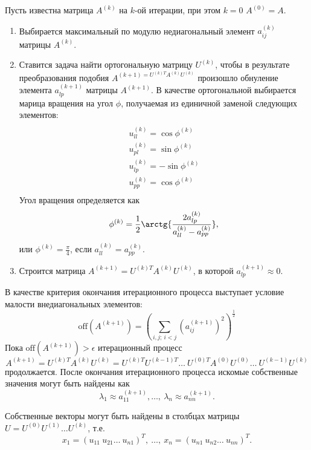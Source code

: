 \documentclass[a4paper,12pt]{article}
\begin{document}
Пусть известна матрица $A^{(k)}$ на $k$-ой итерации, при этом
$k = 0$ $A^{(0)} = A$.
\begin{enumerate}
    \item Выбирается максимальный по модулю недиагональный
    элемент $a_{ij}^{(k)}$ матрицы $A^{(k)}$.
    \item Ставится задача найти ортогональную матрицу $U^{(k)}$,
    чтобы в результате преобразования подобия
    $A^{(k + 1) = U^{(k) T} A^{(k)} U^{(k)}}$
    произошло обнуление элемента $a_{lp}^{(k + 1)}$
    матрицы $A^{(k + 1)}$. В качестве ортогональной выбирается
    марица вращения на угол $\phi$, получаемая из единичной
    заменой следующих элементов:
    \begin{multline}
    \\
    u^{(k)}_{ll} = \cos{\phi^{(k)}} \\
    u^{(k)}_{pl} = \sin{\phi^{(k)}} \\
    u^{(k)}_{lp} = -\sin{\phi^{(k)}} \\
    u^{(k)}_{pp} = \cos{\phi^{(k)}} \\
    \end{multline}
    Угол вращения определяется как
    $$
    \phi^{(k)} = \frac{1}{2}\arctg{\frac{2a_{lp}^{(k)}}{a_{ll}^{(k)} - a_{pp}^{(k)}}},
    $$
    или $\phi^{(k)} = \frac{\pi}{4}$, если $a_{ll}^{(k)} = a_{pp}^{(k)}$.

    \item Строится матрица $A^{(k + 1)} = U^{(k)T} A^{(k)} U^{(k)}$, 
        в которой $a_{lp}^{(k + 1)} \approx 0$.
\end{enumerate}

В качестве критерия окончания итерационного процесса выступает условие
малости внедиагональных элементов:
$$
\text{off}(A^{(k + 1)}) = (\sum_{i,j;\ i < j} (a_{ij}^{(k + 1)})^2)^{\frac{1}{2}}
$$
Пока $\text{off}(A^{(k + 1)}) > \epsilon$ итерационный процесс
$$
A^{(k + 1)} = U^{(k)T} A^{(k)} U^{(k)} = U^{(k)T} U^{(k - 1)T} \ldots\ U^{(0)T} A^{(0)}
U^{(0)} \ldots\ U^{(k - 1)} U^{(k)}
$$
продолжается. После окончания итерационного процесса искомые
собственные значения могут быть найдены как
$$
\lambda_1 \approx a_{11}^{(k + 1)}, \ldots,\ \lambda_n \approx a_{nn}^{(k + 1)}.
$$

Собственные векторы могут быть найдены в столбцах матрицы
$U = U^{(0)} U^{(1)} \ldots U^{(k)}$, т.е.
$$
x_1 = (u_{11}\ u_{21} \ldots\ u_{n1})^{T},\ \ldots,\ x_n = (u_{n1}\ u_{n2} \ldots\ u_{nn})^{T}.
$$
\end{document}
